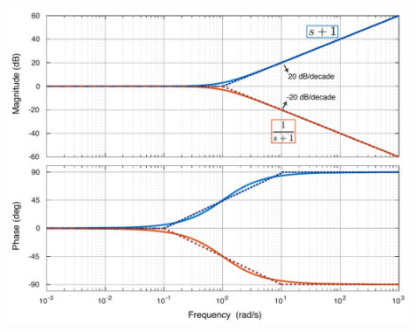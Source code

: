 \documentclass[twoside]{article}
\begin{document}
  \begin{minipage}[h]{1\linewidth}
    \begin{center}
      \includegraphics[width=0.9\textwidth]{sp1}
    \end{center}
  \end{minipage}

\vspace{6 pt}
\end{document}
